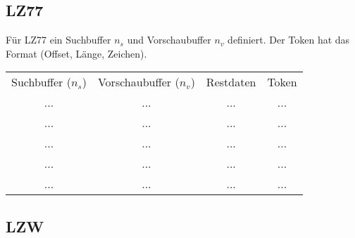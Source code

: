 \subsection{LZ77}
Für LZ77 ein Suchbuffer $n_{s}$ und Vorschaubuffer $n_{v}$ definiert.
Der Token hat das Format (Offset, Länge, Zeichen).
\begin{center}
    \begin{tabular}{ c c c c }
        Suchbuffer ($n_{s}$) & Vorschaubuffer ($n_{v}$) & Restdaten & Token \\ 
        ... & ... & ... & ... \\  
        ... & ... & ... & ... \\  
        ... & ... & ... & ... \\  
        ... & ... & ... & ... \\  
        ... & ... & ... & ... \\  
    \end{tabular}
\end{center}
\subsection{LZW}

